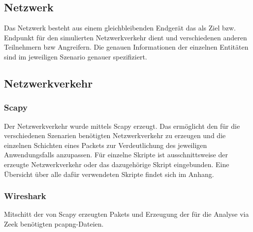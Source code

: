 \subsection{Netzwerk}
Das Netzwerk besteht aus einem gleichbleibenden Endgerät das als Ziel bzw. Endpunkt für den simulierten Netzwerkverkehr dient und verschiedenen anderen Teilnehmern bzw Angreifern. Die genauen Informationen der einzelnen Entitäten sind im jeweiligen Szenario genauer spezifiziert.
\subsection{Netzwerkverkehr}
\subsubsection{Scapy}
Der Netzwerkverkehr wurde mittels Scapy erzeugt. Das ermöglicht den für die verschiedenen Szenarien benötigten Netzwerkverkehr zu erzeugen und die einzelnen Schichten eines Packets zur Verdeutlichung des jeweiligen Anwendungsfalls anzupassen. Für einzelne Skripte ist ausschnittsweise der erzeugte Netzwerkverkehr oder das dazugehörige Skript eingebunden. Eine Übersicht über alle dafür verwendeten Skripte findet sich im Anhang.
\subsubsection{Wireshark}
Mitschitt der von Scapy erzeugten Pakets und Erzeugung der für die Analyse via Zeek benötigten pcapng-Dateien.

